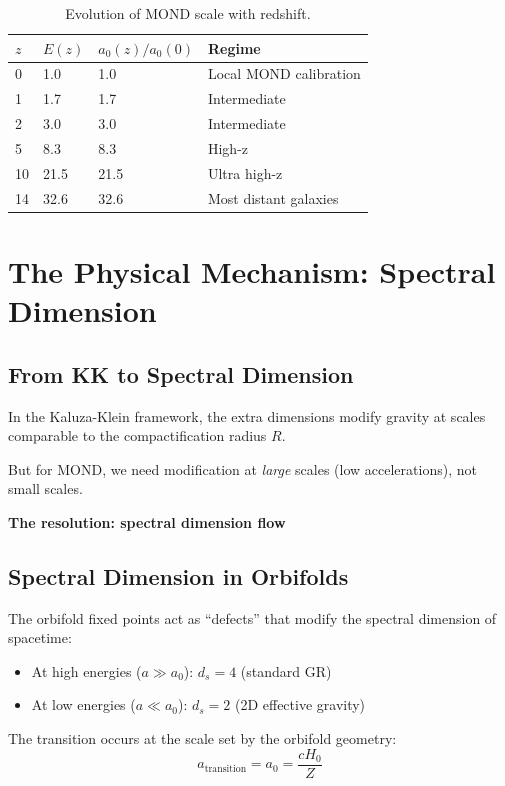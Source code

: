 \documentclass[12pt,a4paper]{article}
\begin{document}
\begin{table}[h]
\centering
\begin{tabular}{@{}llll@{}}
\toprule
$z$ & $E(z)$ & $a_0(z) / a_0(0)$ & Regime \\
\midrule
0 & 1.0 & 1.0 & Local MOND calibration \\
1 & 1.7 & 1.7 & Intermediate \\
2 & 3.0 & 3.0 & Intermediate \\
5 & 8.3 & 8.3 & High-z \\
10 & 21.5 & 21.5 & Ultra high-z \\
14 & 32.6 & 32.6 & Most distant galaxies \\
\bottomrule
\end{tabular}
\caption{Evolution of MOND scale with redshift.}
\end{table}

\section{The Physical Mechanism: Spectral Dimension}

\subsection{From KK to Spectral Dimension}

In the Kaluza-Klein framework, the extra dimensions modify gravity at scales comparable to the compactification radius $R$.

But for MOND, we need modification at \textit{large} scales (low accelerations), not small scales.

\textbf{The resolution: spectral dimension flow}

\subsection{Spectral Dimension in Orbifolds}

The orbifold fixed points act as ``defects'' that modify the spectral dimension of spacetime:

\begin{itemize}
\item At high energies ($a \gg a_0$): $d_s = 4$ (standard GR)
\item At low energies ($a \ll a_0$): $d_s = 2$ (2D effective gravity)
\end{itemize}

The transition occurs at the scale set by the orbifold geometry:
\begin{equation}
a_{\text{transition}} = a_0 = \frac{cH_0}{Z}
\end{equation}
\end{document}
